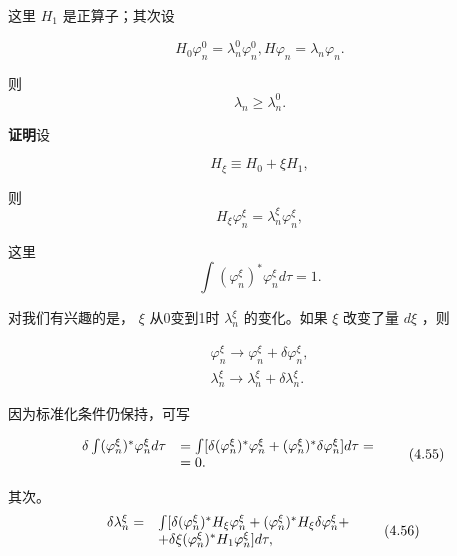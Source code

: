 这里 $H_{1}$ 是正算子；其次设

\begin{equation*}
H _ {0} \varphi_ {n} ^ {0} = \lambda_ {n} ^ {0} \varphi_ {n} ^ {0}, H \varphi_ {n} = \lambda_ {n} \varphi_ {n}.\tag{4.50}
\end{equation*}

则
\begin{equation*}
\lambda_ {n} \geqslant \lambda_ {n} ^ {0}.\tag{4.51}
\end{equation*}

\textbf{证明}\quad 设

\begin{equation*}
H _ {\xi} \equiv H _ {0} + \xi H _ {1},\tag{4.52}
\end{equation*}

则
\begin{equation*}
H _ {\xi} \varphi_ {n} ^ {\xi} = \lambda_ {n} ^ {\xi} \varphi_ {n} ^ {\xi},\tag{4.53}
\end{equation*}

这里
\begin{equation*}
\int \left(\varphi_ {n} ^ {\xi}\right) ^ {*} \varphi_ {n} ^ {\xi} d \tau = 1.
\end{equation*}

对我们有兴趣的是， $\xi$ 从0变到1时 $\lambda_{n}^{\xi}$ 的变化。如果 $\xi$ 改变了量 $d\xi$ ，则

\begin{equation*}
\begin{array}{l} \varphi_ {n} ^ {\xi} \longrightarrow \varphi_ {n} ^ {\xi} + \delta \varphi_ {n} ^ {\xi}, \\ \lambda_ {n} ^ {\xi} \longrightarrow \lambda_ {n} ^ {\xi} + \delta \lambda_ {n} ^ {\xi}. \end{array}\tag{4.54}
\end{equation*}

因为标准化条件仍保持，可写

\begin{equation*}
\begin{array}{r l} \delta \int (\varphi_ {n} ^ {\xi}) ^ {*} \varphi_ {n} ^ {\xi} d \tau & = \int [ \delta (\varphi_ {n} ^ {\xi}) ^ {*} \varphi_ {n} ^ {\xi} + (\varphi_ {n} ^ {\xi}) ^ {*} \delta \varphi_ {n} ^ {\xi} ] d \tau = \\ & = 0. \end{array}\tag{4.55}
\end{equation*}

其次。
\begin{equation*}
\begin{array}{r l} \delta \lambda_ {n} ^ {\xi} = & \int [ \delta (\varphi_ {n} ^ {\xi}) ^ {*} H _ {\xi} \varphi_ {n} ^ {\xi} + (\varphi_ {n} ^ {\xi}) ^ {*} H _ {\xi} \delta \varphi_ {n} ^ {\xi} + \\ & + \delta \xi (\varphi_ {n} ^ {\xi}) ^ {*} H _ {1} \varphi_ {n} ^ {\xi} ] d \tau , \end{array}\tag{4.56}
\end{equation*}

